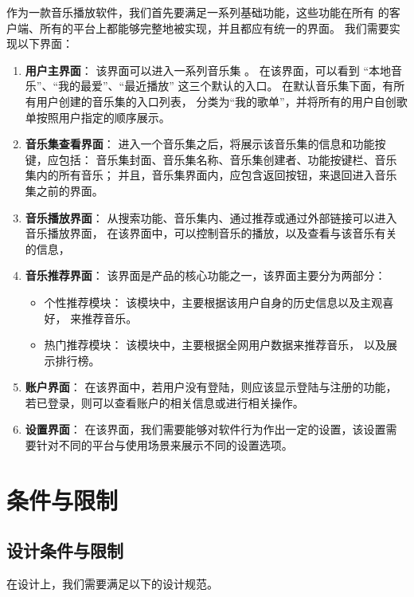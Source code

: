  作为一款音乐播放软件，我们首先要满足一系列基础功能，这些功能在所有
的客户端、所有的平台上都能够完整地被实现，并且都应有统一的界面。
我们需要实现以下界面：
\begin{enumerate}
    \item \textbf{用户主界面}：
    该界面可以进入一系列音乐集 。
        在该界面，可以看到
        ``本地音乐''、``我的最爱''、``最近播放''
        这三个默认的入口。
        在默认音乐集下面，有所有用户创建的音乐集的入口列表，
        分类为``我的歌单''，并将所有的用户自创歌单按照用户指定的顺序展示。
    \item \textbf{音乐集查看界面}：
    进入一个音乐集之后，将展示该音乐集的信息和功能按键，应包括：
    音乐集封面、音乐集名称、音乐集创建者、功能按键栏、音乐集内的所有音乐；
    并且，音乐集界面内，应包含返回按钮，来退回进入音乐集之前的界面。
    \item \textbf{音乐播放界面}：
    从搜索功能、音乐集内、通过推荐或通过外部链接可以进入音乐播放界面，
        在该界面中，可以控制音乐的播放，以及查看与该音乐有关的信息，
    \item \textbf{音乐推荐界面}：
        该界面是产品的核心功能之一，该界面主要分为两部分：
        \begin{itemize}
            \item 个性推荐模块：
                该模块中，主要根据该用户自身的历史信息以及主观喜好，
                来推荐音乐。
            \item 热门推荐模块：
                该模块中，主要根据全网用户数据来推荐音乐，
                以及展示排行榜。
        \end{itemize}
    \item \textbf{账户界面}：
        在该界面中，若用户没有登陆，则应该显示登陆与注册的功能，
        若已登录，则可以查看账户的相关信息或进行相关操作。
    \item \textbf{设置界面}：
        在该界面，我们需要能够对软件行为作出一定的设置，该设置需要针对不同的平台与使用场景来展示不同的设置选项。
\end{enumerate}

\section{条件与限制}

\subsection{设计条件与限制} %

在设计上，我们需要满足以下的设计规范。

